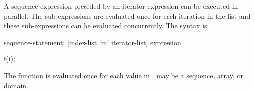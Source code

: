 A sequence expression preceded by an iterator expression can be
executed in parallel. The sub-expressions are evaluated once for each
iteration in the list and these sub-expressions can be evaluated
concurrently. The syntax is:
\begin{syntax}
sequence-statement:
   [index-list `in' iterator-list] expression
\end{syntax}

\begin{example}
\begin{chapel}
[i in S] f(i);
\end{chapel}
The function  is evaluated once for each value in . 
may be a sequence, array, or domain.
\end{example}
